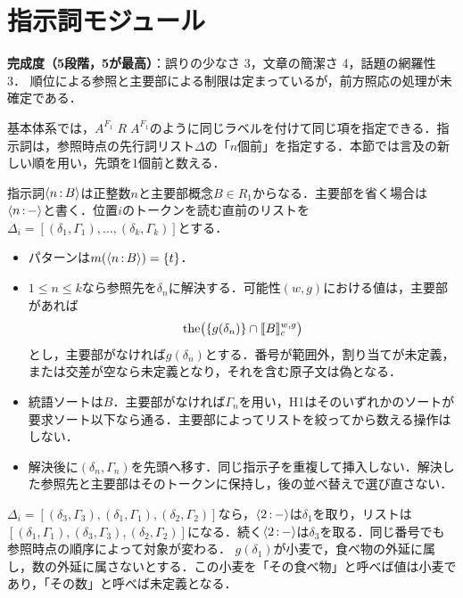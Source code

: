 \documentclass[../../main-detail.tex]{subfiles}
\begin{document}
\section{指示詞モジュール}\label{subsec:demonstrative}
\begin{leftwavybox}
\textbf{完成度（5段階，5が最高）}：誤りの少なさ 3，文章の簡潔さ 4，話題の網羅性 3．
順位による参照と主要部による制限は定まっているが，前方照応の処理が未確定である．
\end{leftwavybox}
基本体系では，$A^{F_1}\;R\;A^{F_1}$のように同じラベルを付けて同じ項を指定できる．指示詞は，参照時点の先行詞リスト$\Delta$の「$n$個前」を指定する．本節では言及の新しい順を用い，先頭を1個前と数える．

\begin{definition}[指示詞トークン]
    指示詞$\mathopen{\langle}n\,{:}\,B\mathclose{\rangle}$は正整数$n$と主要部概念$B\in R_1$からなる．主要部を省く場合は$\mathopen{\langle}n\,{:}\,-\mathclose{\rangle}$と書く．位置$i$のトークンを読む直前のリストを
    $\Delta_i=[(\delta_1,\Gamma_1),\ldots,(\delta_k,\Gamma_k)]$とする．
    \begin{itemize}
        \item パターンは$m(\mathopen{\langle}n\,{:}\,B\mathclose{\rangle})=\{t\}$．
        \item $1\leq n\leq k$なら参照先を$\delta_n$に解決する．可能性$(w,g)$における値は，主要部があれば
        \[
            \mathrm{the}\bigl(\{g(\delta_n)\}\cap\llbracket B\rrbracket_c^{w,g}\bigr)
        \]
        とし，主要部がなければ$g(\delta_n)$とする．番号が範囲外，割り当てが未定義，または交差が空なら未定義となり，それを含む原子文は偽となる．
        \item 統語ソートは$B$．主要部がなければ$\Gamma_n$を用い，H1はそのいずれかのソートが要求ソート以下なら通る．主要部によってリストを絞ってから数える操作はしない．
        \item 解決後に$(\delta_n,\Gamma_n)$を先頭へ移す．同じ指示子を重複して挿入しない．解決した参照先と主要部はそのトークンに保持し，後の並べ替えで選び直さない．
    \end{itemize}
\end{definition}
\begin{example}
    $\Delta_i=[(\delta_3,\Gamma_3),(\delta_1,\Gamma_1),(\delta_2,\Gamma_2)]$なら，$\mathopen{\langle}2\,{:}\,-\mathclose{\rangle}$は$\delta_1$を取り，リストは$[(\delta_1,\Gamma_1),(\delta_3,\Gamma_3),(\delta_2,\Gamma_2)]$になる．続く$\mathopen{\langle}2\,{:}\,-\mathclose{\rangle}$は$\delta_3$を取る．同じ番号でも参照時点の順序によって対象が変わる．
    $g(\delta_1)$が小麦で，食べ物の外延に属し，数の外延に属さないとする．この小麦を「その食べ物」と呼べば値は小麦であり，「その数」と呼べば未定義となる．
\end{example}
\end{document}
